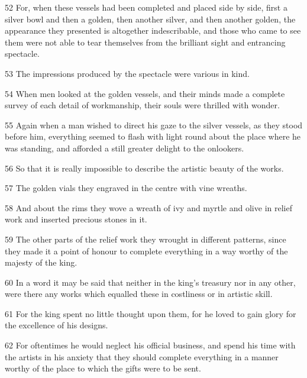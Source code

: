 \par 52 For, when these vessels had been completed and placed side by side, first a silver bowl and then a golden, then another silver, and then another golden, the appearance they presented is altogether indescribable, and those who came to see them were not able to tear themselves from the brilliant sight and entrancing spectacle.

\par 53 The impressions produced by the spectacle were various in kind.

\par 54 When men looked at the golden vessels, and their minds made a complete survey of each detail of workmanship, their souls were thrilled with wonder.

\par 55 Again when a man wished to direct his gaze to the silver vessels, as they stood before him, everything seemed to flash with light round about the place where he was standing, and afforded a still greater delight to the onlookers.

\par 56 So that it is really impossible to describe the artistic beauty of the works.

\par 57 The golden vials they engraved in the centre with vine wreaths.

\par 58 And about the rims they wove a wreath of ivy and myrtle and olive in relief work and inserted precious stones in it.

\par 59 The other parts of the relief work they wrought in different patterns, since they made it a point of honour to complete everything in a way worthy of the majesty of the king.

\par 60 In a word it may be said that neither in the king's treasury nor in any other, were there any works which equalled these in costliness or in artistic skill.

\par 61 For the king spent no little thought upon them, for he loved to gain glory for the excellence of his designs.

\par 62 For oftentimes he would neglect his official business, and spend his time with the artists in his anxiety that they should complete everything in a manner worthy of the place to which the gifts were to be sent.

